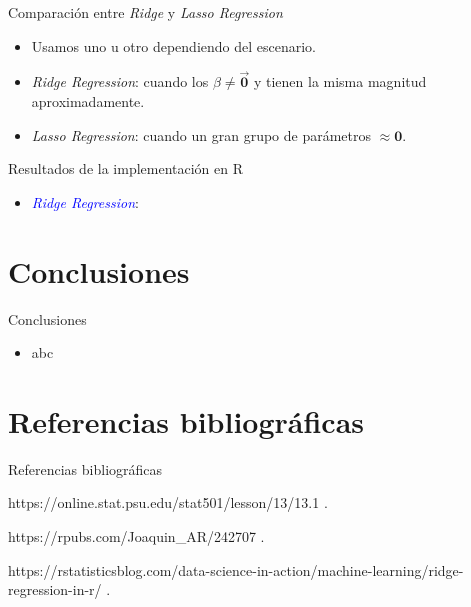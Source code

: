 \documentclass[11pt]{beamer}
\newcommand{\B}{\beta}
\begin{document}
\begin{frame}{Comparación entre \textit{Ridge} y \textit{Lasso Regression}}
	\begin{itemize}
		\item Usamos uno u otro dependiendo del escenario.
		\item \textit{Ridge Regression}: cuando los $\B \not = \vec{\mathbf{0}}$ y tienen la misma magnitud aproximadamente.
		\item \textit{Lasso Regression}: cuando un gran grupo de parámetros $\approx \mathbf{0}$.
	\end{itemize}
\end{frame}

\begin{frame}{Resultados de la implementación en R}
	\begin{itemize}
		\item \textcolor{blue}{\textit{Ridge Regression}}:
	\end{itemize}
\end{frame}

\section{Conclusiones}

\begin{frame}{Conclusiones}
	\begin{itemize}
		\item abc
	\end{itemize}
\end{frame}


\section{Referencias bibliográficas}

\begin{frame}{Referencias bibliográficas}
	\begin{thebibliography}{10}

		\beamertemplateonlinebibitems %
		https://online.stat.psu.edu/stat501/lesson/13/13.1
		.

		\beamertemplateonlinebibitems %
		https://rpubs.com/Joaquin\_AR/242707
		.

		\beamertemplateonlinebibitems %
		https://rstatisticsblog.com/data-science-in-action/machine-learning/ridge-regression-in-r/
		.


	\end{thebibliography}
\end{frame}
\end{document}
